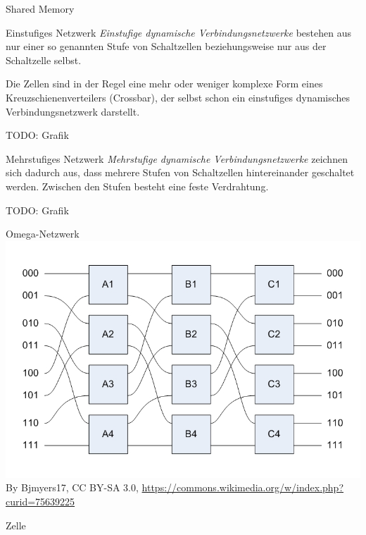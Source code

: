 \begin{defi}{Shared Memory}
    \begin{defi}{Einstufiges Netzwerk}
        \emph{Einstufige dynamische Verbindungsnetzwerke} bestehen aus nur einer so genannten Stufe von Schaltzellen beziehungsweise nur aus der Schaltzelle selbst.

        Die Zellen sind in der Regel eine mehr oder weniger komplexe Form eines Kreuzschienenverteilers (Crossbar), der selbst schon ein einstufiges dynamisches Verbindungsnetzwerk darstellt.

        TODO: Grafik
    \end{defi}

    \begin{defi}{Mehrstufiges Netzwerk}
        \emph{Mehrstufige dynamische Verbindungsnetzwerke} zeichnen sich dadurch aus, dass mehrere Stufen von Schaltzellen hintereinander geschaltet werden.
        Zwischen den Stufen besteht eine feste Verdrahtung.

        TODO: Grafik
    \end{defi}

    \begin{defi}{Omega-Netzwerk}
        \includegraphics[width=\textwidth]{images/OmegaNetwork.jpg}
        By Bjmyers17, CC BY-SA 3.0, \url{https://commons.wikimedia.org/w/index.php?curid=75639225}

    \end{defi}

    \begin{defi}{Zelle}


\end{defi}
\end{defi}
